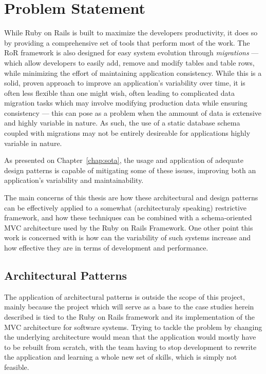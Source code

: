 \chapter{Problem Statement}\label{chap:problem_statement}

While Ruby on Rails is built to maximize the developers productivity, it does so by providing a comprehensive set of tools that perform most of the work. The RoR framework is also designed for easy system evolution through \emph{migrations} --- which allow developers to easily add, remove and modify tables and table rows, while minimizing the effort of maintaining application consistency. While this is a solid, proven approach to improve an application's variability over time, it is often less flexible than one might wish, often leading to complicated data migration tasks which may involve modifying production data while ensuring consistency --- this can pose as a problem when the ammount of data is extensive and highly variable in nature. As such, the use of a static database schema coupled with migrations may not be entirely desireable for applications highly variable in nature.

As presented on Chapter~\ref{chap:sota}, the usage and application of adequate design patterns is capable of mitigating some of these issues, improving both an application's variability and maintainability.

The main concerns of this thesis are how these architectural and design patterns can be effectively applied to a somewhat (architecturaly speaking) restrictive framework, and how these techniques can be combined with a schema-oriented MVC architecture used by the Ruby on Rails Framework. One other point this work is concerned with is how can the variability of such systems increase and how effective they are in terms of development and performance.

\section{Architectural Patterns}\label{sec:architectural_patterns}

The application of architectural patterns is outside the scope of this project, mainly because the project which will serve as a base to the case studies herein described is tied to the Ruby on Rails framework and its implementation of the MVC architecture for software systems. Trying to tackle the problem by changing the underlying architecture would mean that the application would mostly have to be rebuilt from scratch, with the team having to stop development to rewrite the application and learning a whole new set of skills, which is simply not feasible.

